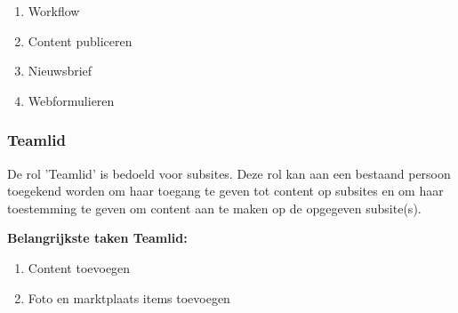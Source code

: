 \begin{enumerate}
\item Workflow
\item Content publiceren
\item Nieuwsbrief
\item Webformulieren
\end{enumerate}

\subsubsection{Teamlid}\label{teamlid}
De rol 'Teamlid' is bedoeld voor subsites. Deze rol kan aan een bestaand persoon toegekend worden om haar toegang te geven tot content op subsites en om haar toestemming te geven om content aan te maken op de opgegeven subsite(s).

\textbf{Belangrijkste taken Teamlid:}

\begin{enumerate}
\item Content toevoegen
\item Foto en marktplaats  items toevoegen
\end{enumerate}